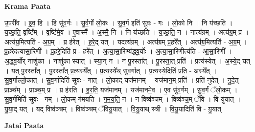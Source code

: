 \documentclass[17pt]{extarticle}
\begin{document}
\textbf{Krama Paata} \newline

उ॒परी॑व । इ॒व॒ हि । हि सु॑व॒र्गः । सु॒र्व॒र्गो लो॒कः । सु॒व॒र्ग इति॑ सुवः - गः । लो॒को नि । नि य॑च्छति । य॒च्छ॒ति॒ वृष्टि᳚म् । वृष्टि॑मे॒व । ए॒वास्मै᳚ । अ॒स्मै॒ नि । नि य॑च्छति । य॒च्छ॒ति॒ न । नात्य॑ग्रम् । अत्य॑ग्र॒म् प्र । अत्य॑ग्र॒मित्यति॑ - अ॒ग्र॒म् । प्र ह॑रेत् । ह॒रे॒द् यत् । यदत्य॑ग्रम् । अत्य॑ग्रम् प्र॒हरे᳚त् । अत्य॑ग्र॒मित्यति॑ - अ॒ग्र॒म् । प्र॒हरे॑दत्यासा॒रिणी᳚ । प्र॒हरे॒दिति॑ प्र - हरे᳚त् । अ॒त्या॒सा॒रिण्य॑द्ध्व॒र्योः । अ॒त्या॒सा॒रिणीत्य॑ति - आ॒सा॒रिणी᳚ । अ॒द्ध्व॒र्योर् नाशु॑का । नाशु॑का स्यात् । स्या॒न् न । न पु॒रस्ता᳚त् । पु॒रस्ता॒त् प्रति॑ । प्रत्य॑स्येत् । अ॒स्ये॒द् यत् । यत् पु॒रस्ता᳚त् । पु॒रस्ता᳚त् प्र॒त्यस्ये᳚त् । प्र॒त्यस्ये᳚थ् सुव॒र्गात् । प्र॒त्यस्ये॒दिति॑ प्रति - अस्ये᳚त् । सु॒व॒र्गाल्लो॒कात् । सु॒व॒र्गादिति॑ सुवः - गात् । लो॒काद् यज॑मानम् । यज॑मान॒म् प्रति॑ । प्रति॑ नुदेत् । नु॒दे॒त् प्राञ्च᳚म् । प्राञ्च॒म् प्र । प्र ह॑रति । ह॒र॒ति॒ यज॑मानम् । यज॑मानमे॒व । ए॒व सु॑व॒र्गम् । सु॒व॒र्गं ॅलो॒कम् । सु॒व॒र्गमिति॑ सुवः - गम् । लो॒कम् ग॑मयति । ग॒म॒य॒ति॒ न । न विष्व॑ञ्चम् । विष्व॑ञ्च॒म् ॅवि । वि यु॑यात् । यु॒या॒द् यत् । यद् विष्व॑ञ्चम् । विष्व॑ञ्चम् ॅवियु॒यात् । वि॒यु॒याथ् स्त्री । वि॒यु॒यादिति॑ वि - यु॒यात् \newline

\textbf{Jatai Paata} \newline
\end{document}
